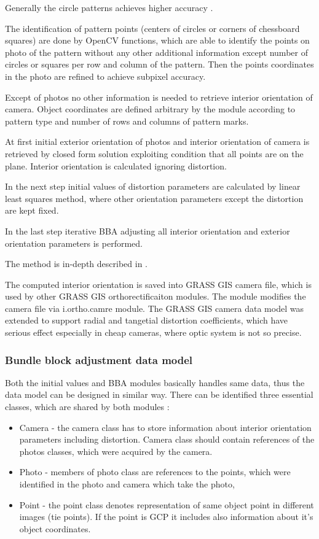 \documentclass[a4paper,12pt]{article}
\begin{document}
Generally the circle patterns achieves higher accuracy \cite{camera_calibration2013opencv}.

The identification of pattern points (centers of circles or corners of chessboard squares) 
are done by OpenCV functions, which are able to identify the points on photo of the pattern 
without any other additional information except number of circles or squares per row and column
of the pattern. Then the points coordinates in the photo are refined to achieve subpixel accuracy.

Except of photos no other information is needed to retrieve interior orientation of camera.
Object coordinates are defined
arbitrary by the module according to pattern type and number of rows and columns of pattern marks.

At first  initial exterior orientation of photos and interior orientation of camera is retrieved 
by closed form solution exploiting condition that all points are on the plane.
Interior orientation is calculated ignoring distortion.

In the next step initial values of distortion parameters are calculated by linear least squares method, 
where other orientation parameters except the distortion are kept fixed.

In the last step iterative BBA adjusting all interior orientation and exterior orientation parameters 
is performed.

The method is in-depth described 
in \cite{zhang2000flexible}.

The computed interior orientation is saved into GRASS GIS camera file, which is used by other GRASS GIS 
orthorectificaiton modules. The module modifies the camera file via i.ortho.camre module.
The GRASS GIS camera data model was extended to support radial and tangetial distortion coefficients, which 
have serious effect especially in cheap cameras, where optic system is not so precise.

\subsubsection{Bundle block adjustment data model}
 
Both the initial values and BBA modules basically handles  same data, thus 
the data model can be designed in similar way. There can be 
identified three essential classes, which are shared by both modules :
\begin{itemize}
\item Camera - the camera class has to store information about interior orientation 
parameters including distortion. Camera class should contain references of the photos
classes, which were acquired by the camera.
\item Photo - members of photo class are references to the points, which were identified 
	    in the photo and camera which take the photo,
\item Point - the point class denotes representation of same object point in different images (tie points).
 If the point is GCP it includes also information about it's object coordinates. 
\end{itemize}
\end{document}
